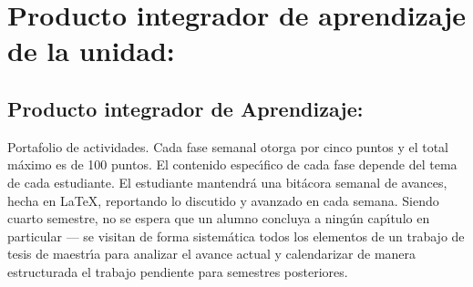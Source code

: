 \documentclass[10 pt]{article}
\begin{document}
  
  \newpage

\section{Producto integrador de aprendizaje de la unidad:}
\subsection{Producto integrador de Aprendizaje:} 

Portafolio de actividades. Cada fase semanal otorga por cinco puntos y
el total m\'{a}ximo es de 100 puntos. El contenido espec\'{\i}fico de
cada fase depende del tema de cada estudiante. El estudiante
mantendr\'{a} una bit\'{a}cora semanal de avances, hecha en \LaTeX,
reportando lo discutido y avanzado en cada semana. Siendo cuarto
semestre, no se espera que un alumno concluya a ning\'{u}n
cap\'{\i}tulo en particular --- se visitan de forma sistem\'{a}tica
todos los elementos de un trabajo de tesis de maestr\'{\i}a para analizar
el avance actual y calendarizar de manera estructurada el trabajo
pendiente para semestres posteriores.
\end{document}
